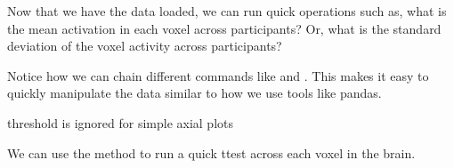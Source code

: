 \documentclass[letterpaper,10pt,english]{sphinxmanual}
\begin{document}
\begin{sphinxVerbatim}[commandchars=\\\{\}]
 

  
     
  
\end{sphinxVerbatim}

Now that we have the data loaded, we can run quick operations such as, what is the mean activation in each voxel across participants?  Or, what is the standard deviation of the voxel activity across participants?

Notice how we can chain different commands like  and .  This makes it easy to quickly manipulate the data similar to how we use tools like pandas.

\begin{sphinxVerbatim}[commandchars=\\\{\}]
\end{sphinxVerbatim}

\begin{sphinxVerbatim}[commandchars=\\\{\}]
threshold is ignored for simple axial plots
\end{sphinxVerbatim}

\noindent{}

We can use the  method to run a quick t\sphinxhyphen{}test across each voxel in the brain.
\end{document}
